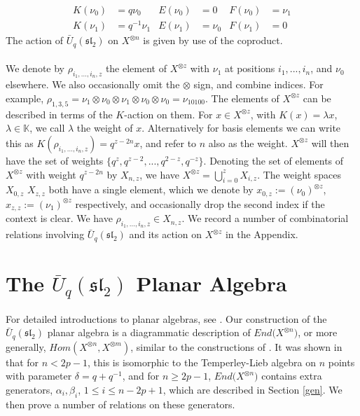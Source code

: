 \documentclass[]{article}
\begin{document}
\begin{align*}
K(\nu_{0})&=q\nu_{0} & E(\nu_{0})&=0 & F(\nu_{0})&=\nu_{1}\\
K(\nu_{1})&=q^{-1}\nu_{1} & E(\nu_{1})&=\nu_{0} & F(\nu_{1})&=0
\end{align*}
The action of $\bar{U}_{q}(\mathfrak{sl}_{2})$ on $X^{\otimes n}$ is given by use of the coproduct.\\
\\
We denote by $\rho_{i_{1},...,i_{n},z}$ the element of $X^{\otimes z}$ with $\nu_{1}$ at positions $i_{1},...,i_{n}$, and $\nu_{0}$ elsewhere. We also occasionally omit the $\otimes$ sign, and combine indices. For example, $\rho_{1,3,5}=\nu_{1}\otimes\nu_{0}\otimes\nu_{1}\otimes\nu_{0}\otimes\nu_{0}=\nu_{10100}$. The elements of $X^{\otimes z}$ can be described in terms of the $K$-action on them. For $x\in X^{\otimes z}$, with $K(x)=\lambda x$, $\lambda\in\mathbb{K}$, we call $\lambda$ the weight of $x$. Alternatively for basis elements we can write this as $K(\rho_{i_{1},...,i_{n},z})=q^{z-2n}x$, and refer to $n$ also as the weight. $X^{\otimes z}$ will then have the set of weights $\{q^{z},q^{z-2},...,q^{2-z},q^{-z}\}$. Denoting the set of elements of $X^{\otimes z}$ with weight $q^{z-2n}$ by $X_{n,z}$, we have $X^{\otimes z}=\bigcup\limits_{i=0}^{z}X_{i,z}$. The weight spaces $X_{0,z}$ $X_{z,z}$ both have a single element, which we denote by $x_{0,z}:=(\nu_{0})^{\otimes z}$, $x_{z,z}:=(\nu_{1})^{\otimes z}$ respectively, and occasionally drop the second index if the context is clear. We have $\rho_{i_{1},...,i_{n},z}\in X_{n,z}$. We record a number of combinatorial relations involving $\bar{U}_{q}(\mathfrak{sl}_{2})$ and its action on $X^{\otimes z}$ in the Appendix.

\section{The $\bar{U}_{q}(\mathfrak{sl}_{2})$ Planar Algebra}
For detailed introductions to planar algebras, see \cite{JonesP1, MPS}. Our construction of the $\bar{U}_{q}(\mathfrak{sl}_{2})$ planar algebra is a diagrammatic description of $End\big(X^{\otimes n}\big)$, or more generally, $Hom(X^{\otimes n},X^{\otimes m})$, similar to the constructions of \cite{EvansPugh2,FrKhov,Kuper,Morrison}. It was shown in \cite{GST} that for $n<2p-1$, this is isomorphic to the Temperley-Lieb algebra on $n$ points with parameter $\delta=q+q^{-1}$, and for $n\geq 2p-1$,  $End\big(X^{\otimes n}\big)$ contains extra generators, $\alpha_{i},\beta_{i}$, $1\leq i\leq n-2p+1$, which are described in Section \ref{gen}. We then prove a number of relations on these generators.\\
\end{document}
